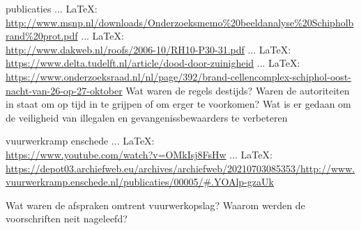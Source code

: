 \begin{thebibliography}{99}
{{{	
	
	publicaties
	 ... \LaTeX:\\ \url{http://www.msnp.nl/downloads/Onderzoeksmemo%20beeldanalyse%20Schipholbrand%20prot.pdf}
	 ... \LaTeX:\\ \url{http://www.dakweb.nl/roofs/2006-10/RH10-P30-31.pdf}
	 ... \LaTeX:\\ \url{https://www.delta.tudelft.nl/article/dood-door-zuinigheid}
	 ... \LaTeX:\\ \url{https://www.onderzoeksraad.nl/nl/page/392/brand-cellencomplex-schiphol-oost-nacht-van-26-op-27-oktober}
	Wat waren de regels destijds?
	Waren de autoriteiten in staat om op tijd in te grijpen of om erger te voorkomen?
	Wat is er gedaan om de veiligheid van illegalen en gevangenissbewaarders te verbeteren
	
	
	
	vuurwerkramp enschede
	 ... \LaTeX:\\ \url{https://www.youtube.com/watch?v=OMkIsj8FsHw}
	 ... \LaTeX:\\ \url{https://depot03.archiefweb.eu/archives/archiefweb/20210703085353/http://www.vuurwerkramp.enschede.nl/publicaties/00005/#.YOAlp-gzaUk}
	
	Wat waren de afspraken omtrent vuurwerkopslag?
	Waarom werden de voorschriften neit nageleefd?
	
	
	
}}}
\end{thebibliography}
